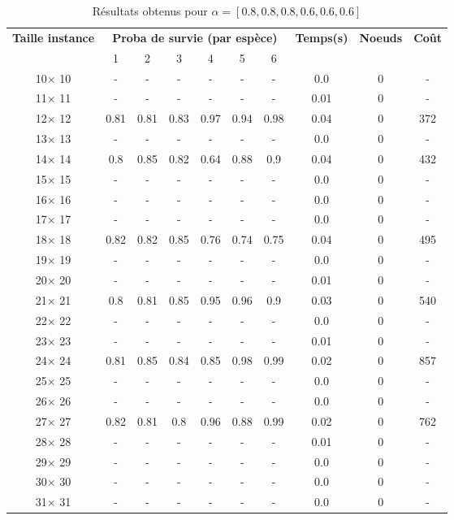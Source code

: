 \documentclass[main.tex]{subfiles}
\begin{document}
\begin{table}
\centering
\caption{Résultats obtenus pour $\alpha = [0.8, 0.8, 0.8, 0.6, 0.6, 0.6]$}
\begin{tabular}{|c||c|c|c|c|c|c||c|c|c|}
\hline
\textbf{Taille instance}&\multicolumn{6}{c}{\textbf{Proba de survie (par espèce)}}&\textbf{Temps(s)}&\textbf{Noeuds}&\textbf{Coût}\\
&1&2&3&4&5&6& & &\\
\hline

10$\times$ 10 & - & - & - & - & - & - &0.0 &0 &-\\
11$\times$ 11 & - & - & - & - & - & - &0.01 &0 &-\\
12$\times$ 12 &0.81 &0.81 &0.83 &0.97 &0.94 &0.98 &0.04 &0 &372\\
13$\times$ 13 & - & - & - & - & - & - &0.0 &0 &-\\
14$\times$ 14 &0.8 &0.85 &0.82 &0.64 &0.88 &0.9 &0.04 &0 &432\\
15$\times$ 15 & - & - & - & - & - & - &0.0 &0 &-\\
16$\times$ 16 & - & - & - & - & - & - &0.0 &0 &-\\
17$\times$ 17 & - & - & - & - & - & - &0.0 &0 &-\\
18$\times$ 18 &0.82 &0.82 &0.85 &0.76 &0.74 &0.75 &0.04 &0 &495\\
19$\times$ 19 & - & - & - & - & - & - &0.0 &0 &-\\
20$\times$ 20 & - & - & - & - & - & - &0.01 &0 &-\\
21$\times$ 21 &0.8 &0.81 &0.85 &0.95 &0.96 &0.9 &0.03 &0 &540\\
22$\times$ 22 & - & - & - & - & - & - &0.0 &0 &-\\
23$\times$ 23 & - & - & - & - & - & - &0.01 &0 &-\\
24$\times$ 24 &0.81 &0.85 &0.84 &0.85 &0.98 &0.99 &0.02 &0 &857\\
25$\times$ 25 & - & - & - & - & - & - &0.0 &0 &-\\
26$\times$ 26 & - & - & - & - & - & - &0.0 &0 &-\\
27$\times$ 27 &0.82 &0.81 &0.8 &0.96 &0.88 &0.99 &0.02 &0 &762\\
28$\times$ 28 & - & - & - & - & - & - &0.01 &0 &-\\
29$\times$ 29 & - & - & - & - & - & - &0.0 &0 &-\\
30$\times$ 30 & - & - & - & - & - & - &0.0 &0 &-\\
31$\times$ 31 & - & - & - & - & - & - &0.0 &0 &-\\

\end{tabular}
\end{table}
\end{document}
